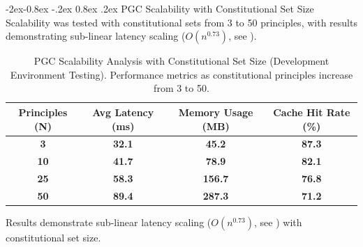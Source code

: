 \documentclass[manuscript,screen,9pt]{acmart}
\makeatletter
\renewcommand\subsubsection{\@startsection{subsubsection}{3}{\z@}%
  {-2ex\@plus -0.8ex \@minus -.2ex}%
  {0.8ex \@plus .2ex}%
  {\normalfont\normalsize\bfseries}}
\newcommand{\tablesize}{\footnotesize}
\newcommand{\tablenumfmt}[1]{\textbf{#1}}
\newcommand{\tableheader}[1]{\textbf{#1}}
\makeatother
\begin{document}
\subsubsection{PGC Scalability with Constitutional Set Size}
Scalability was tested with constitutional sets from 3 to 50 principles, with results demonstrating sub-linear latency scaling ($O(n^{0.73})$, see ).
\begin{table}[htbp]
\centering
\caption{PGC Scalability Analysis with Constitutional Set Size (Development Environment Testing). Performance metrics as constitutional principles increase from 3 to 50.}
\label{tab:pgc_scalability}
\tablesize
\begin{tabular}{@{}cccc@{}}
\toprule
\tableheader{Principles (N)} & \tableheader{Avg Latency (ms)} & \tableheader{Memory Usage (MB)} & \tableheader{Cache Hit Rate (\%)} \\
\midrule
\tablenumfmt{3}   & \tablenumfmt{32.1}  & \tablenumfmt{45.2}  & \tablenumfmt{87.3} \\
\tablenumfmt{10}  & \tablenumfmt{41.7}  & \tablenumfmt{78.9}  & \tablenumfmt{82.1} \\
\tablenumfmt{25}  & \tablenumfmt{58.3}  & \tablenumfmt{156.7} & \tablenumfmt{76.8} \\
\tablenumfmt{50}  & \tablenumfmt{89.4}  & \tablenumfmt{287.3} & \tablenumfmt{71.2} \\
\bottomrule
\end{tabular}
\end{table}
Results demonstrate sub-linear latency scaling ($O(n^{0.73})$, see ) with constitutional set size.
\end{document}

